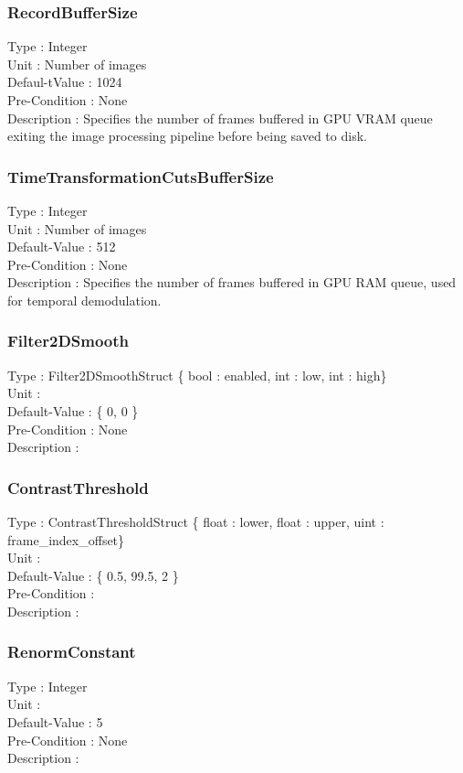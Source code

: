 \subsubsection{RecordBufferSize}
\noindent
Type : Integer\\
Unit : Number of images\\
Defaul-tValue : 1024\\
Pre-Condition : None\\
Description : Specifies the number of frames buffered in GPU VRAM queue exiting the image processing pipeline before being saved to disk.\\

\subsubsection{TimeTransformationCutsBufferSize}
\noindent
Type : Integer\\
Unit : Number of images\\
Default-Value : 512\\
Pre-Condition : None\\
Description : Specifies the number of frames buffered in GPU RAM queue, used for temporal demodulation.\\

\subsubsection{Filter2DSmooth}
\noindent
Type : Filter2DSmoothStruct \{ bool : enabled, int : low, int : high\}\\
Unit :  \\
Default-Value : \{ 0, 0 \}\\
Pre-Condition : None\\
Description : \\

\subsubsection{ContrastThreshold}
\noindent
Type : ContrastThresholdStruct  \{ float : lower, float : upper, uint : frame\_index\_offset\}\\
Unit : \\
Default-Value : \{ 0.5, 99.5, 2 \} \\
Pre-Condition : \\
Description : \\

\subsubsection{RenormConstant}
\noindent
Type : Integer\\
Unit : \\
Default-Value : 5\\
Pre-Condition : None \\
Description :\\


